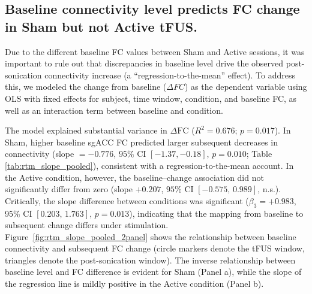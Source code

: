         
        \subsection*{Baseline connectivity level predicts FC change in Sham but not Active tFUS.}
        \noindent
        Due to the different baseline FC values between Sham and Active sessions, it was important to rule out that discrepancies in baseline level drive the observed post-sonication connectivity increase (a ``regression-to-the-mean'' effect). To address this, we modeled the change from baseline ($\Delta FC$) as the dependent variable using OLS with fixed effects for subject, time window, condition, and baseline FC, as well as an interaction term between baseline and condition. 

        The model explained substantial variance in $\Delta \mathrm{FC}$ ($R^2=0.676$; $p=0.017$). In Sham, higher baseline sgACC FC predicted larger subsequent decreases in connectivity (slope $=-0.776$, $95\%$ CI $[-1.37,-0.18]$, $p=0.010$; Table \ref{tab:rtm_slope_pooled}), consistent with a regression-to-the-mean account. In the Active condition, however, the baseline--change association did not significantly differ from zero (slope $+0.207$, $95\%$ CI $[-0.575,\,0.989]$, n.s.). Critically, the slope difference between conditions was significant ($\beta_3=+0.983$, 95\% CI $[0.203,\,1.763]$, $p=0.013$), indicating that the mapping from baseline to subsequent change differs under stimulation. Figure~\ref{fig:rtm_slope_pooled_2panel} shows the relationship between baseline connectivity and subsequent FC change (circle markers denote the tFUS window, triangles denote the post-sonication window). The inverse relationship between baseline level and FC difference is evident for Sham (Panel a), while the slope of the regression line is mildly positive in the Active condition (Panel b).


